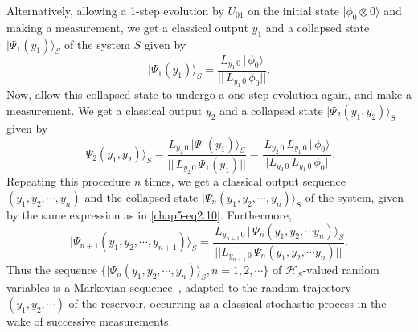 Alternatively, allowing a 1-step evolution by $U_{01}$ on the initial state $\vert \phi_0\otimes 0\rangle$ and making a measurement, we  get a classical output $y_1$ and a collapsed state $\vert\Psi_1(y_1)\rangle_S$ of the system $S$ given by 
\begin{equation} 
\vert\Psi_1(y_1)\rangle_S=\frac{L_{y_1\,0}\, \vert\, \phi_0\rangle}{\vert\vert\, L_{y_1\,0}\, \phi_0\vert\vert}. \label{chap5-eq2.11}
\end{equation}
Now, allow this collapsed state to undergo a one-step evolution again, and make a measurement. We get a classical output $y_2$ and a collapsed state $\vert\Psi_2(y_1,y_2)\rangle_S$ given by  
\begin{equation}
\vert\Psi_2(y_1,y_2)\rangle_S= \frac{L_{y_2\,0}\, \vert\Psi_1(y_1)\rangle_S }{\vert\vert\, L_{y_2\,0}\,\Psi_1(y_1)\vert\vert}
=\frac{ L_{y_2\,0}\,L_{y_1\,0}\, \vert\,\phi_0\rangle}{\vert\vert L_{y_2\,0}\,L_{y_1\,0}\, \phi_0\vert\vert}.\label{chap5-eq2.12}
\end{equation} 
Repeating this procedure $n$ times, we get a classical output sequence $(y_1,y_2,\cdots , y_n)$ and the collapsed state 
$\vert\Psi_n(y_1, y_2,\cdots ,y_{n})\rangle_S$ of the system, given by the same expression as in \eqref{chap5-eq2.10}. Furthermore, 
\begin{equation}
\vert\Psi_{n+1}(y_1, y_2,\cdots ,y_{n+1})\rangle_S=\frac{ \, L_{y_{n+1}\, 0}\, \vert\, \Psi_n(y_1,y_2,\cdots y_n)\rangle_S}
{\vert\vert L_{y_{n+1}\, 0}\, \Psi_n(y_1,y_2,\cdots y_n)\vert\vert}. \label{chap5-eq2.13}
\end{equation} 
Thus the sequence $\{\vert\Psi_n(y_1, y_2,\cdots ,y_{n})\rangle_S, n=1,2,\cdots\}$ of $\mathcal{H}_S$-valued random variables is a Markovian sequence~\cite{key9, key29,key30,key31, key36}, adapted to the random trajectory $(y_1,y_2,\cdots)$ of the reservoir, occurring as a classical stochastic process in the wake of successive measurements.

